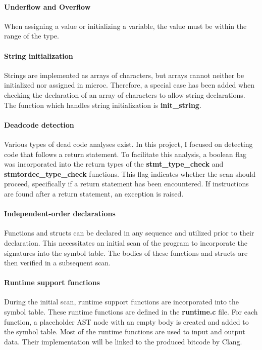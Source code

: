 \documentclass{article}
\begin{document}
\paragraph*{Underflow and Overflow}
When assigning a value or initializing a variable, the value must be within the range of the type.

\paragraph*{String initialization}
Strings are implemented as arrays of characters, but arrays cannot neither be initialized nor assigned in microc.
Therefore, a special case has been added when checking the declaration of an array of characters to allow string declarations.
The function which handles string initialization is \textbf{init\_string}.


\paragraph*{Deadcode detection}
Various types of dead code analyses exist. In this project, I focused on detecting code that follows a return statement.
To facilitate this analysis, a boolean flag was incorporated into the return types of the \textbf{stmt\_type\_check}
and \textbf{stmtordec\_type\_check} functions. This flag indicates whether the scan should proceed, specifically if
a return statement has been encountered. If instructions are found after a return statement, an exception is raised.

\paragraph*{Independent-order declarations}
Functions and structs can be declared in any sequence and utilized prior to their declaration.
This necessitates an initial scan of the program to incorporate the signatures into the symbol table.
The bodies of these functions and structs are then verified in a subsequent scan.

\paragraph*{Runtime support functions}
During the initial scan, runtime support functions are incorporated into the symbol table.
These runtime functions are defined in the \textbf{runtime.c} file.
For each function, a placeholder AST node with an empty body is created
and added to the symbol table.
Most of the runtime functions are used to input and output data.
Their implementation will be linked to the produced bitcode by Clang.
\end{document}
